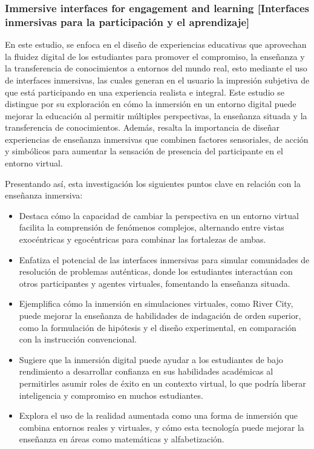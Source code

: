 \subsubsection*{Immersive interfaces for engagement and learning [Interfaces inmersivas para la participación y el aprendizaje]}
En este estudio, \citeauthor{dede2009immersive} \citeyear{dede2009immersive} se enfoca en el diseño de experiencias educativas que aprovechan la fluidez digital de los estudiantes para promover el compromiso, la enseñanza y la transferencia de conocimientos a entornos del mundo real, esto mediante el uso de interfaces inmersivas, las cuales generan en el usuario la impresión subjetiva de que está participando en una experiencia realista e integral. Este estudio se distingue por su exploración en cómo la inmersión en un entorno digital puede mejorar la educación al permitir múltiples perspectivas, la enseñanza situada y la transferencia de conocimientos. Además, resalta la importancia de diseñar experiencias de enseñanza inmersivas que combinen factores sensoriales, de acción y simbólicos para aumentar la sensación de presencia del participante en el entorno virtual.

Presentando así, esta investigación los siguientes puntos clave en relación con la enseñanza inmersiva:

\begin{itemize}
  \item Destaca cómo la capacidad de cambiar la perspectiva en un entorno virtual facilita la comprensión de fenómenos complejos, alternando entre vistas exocéntricas y egocéntricas para combinar las fortalezas de ambas.
  \item Enfatiza el potencial de las interfaces inmersivas para simular comunidades de resolución de problemas auténticas, donde los estudiantes interactúan con otros participantes y agentes virtuales, fomentando la enseñanza situada.
  \item Ejemplifica cómo la inmersión en simulaciones virtuales, como River City, puede mejorar la enseñanza de habilidades de indagación de orden superior, como la formulación de hipótesis y el diseño experimental, en comparación con la instrucción convencional.
  \item Sugiere que la inmersión digital puede ayudar a los estudiantes de bajo rendimiento a desarrollar confianza en sus habilidades académicas al permitirles asumir roles de éxito en un contexto virtual, lo que podría liberar inteligencia y compromiso en muchos estudiantes.
  \item Explora el uso de la realidad aumentada como una forma de inmersión que combina entornos reales y virtuales, y cómo esta tecnología puede mejorar la enseñanza en áreas como matemáticas y alfabetización.
\end{itemize}

